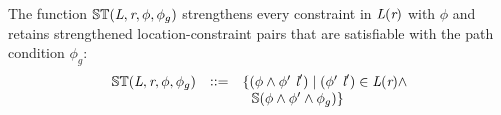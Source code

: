\begin{definition}
\label{def:ST}
The function $\mathbb{ST}(\emph{L},\emph{r},\phi,\phi_g)$
strengthens every constraint in $\emph{L}(\emph{r})$ with
$\phi$ and retains strengthened location-constraint pairs that are satisfiable
with the path condition $\phi_g$:
\[
\begin{array}{rcl} 
\mathbb{ST}(\cfgnt{L},\cfgnt{r},\phi,\phi_g) & \defeq & \{ (\phi\wedge\phi^\prime\ \cfgnt{l}^\prime) \mid (\phi^\prime\ \cfgnt{l}^\prime)\in \cfgnt{L}(\cfgnt{r})\wedge \\ & & 
\ \ \mathbb{S}(\phi\wedge\phi^\prime\wedge\phi_g) \}
\end{array}
\]
\end{definition}
